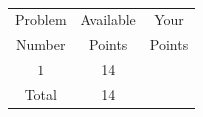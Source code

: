\documentclass[]{exam}
\numberwithin{equation}{section}
\begin{document}
\clearpage
\normalsize
\
\vspace{.5cm}

\huge
\begin{center}
\begin{tabular}{|c|c|c|}
\hline
Problem  & Available  &   Your  \\
Number & Points &    Points  \\	\hline\hline

 $1$  & 14  &   \\	\hline

Total & 14  & \\ \hline
\end{tabular}
\end{center}

\pagebreak
\end{document}
